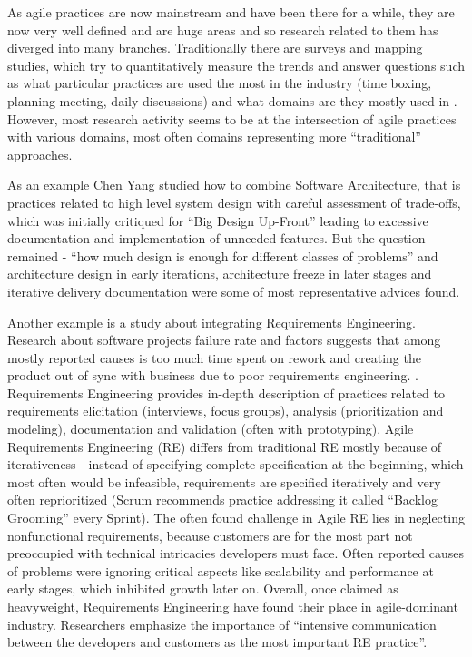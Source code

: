 \documentclass{article}
\begin{document}
As agile practices are now mainstream and have been there for a while, they are now very well defined and are huge areas and so research related to them has diverged into many branches. Traditionally there are surveys and mapping studies, which try to quantitatively measure the trends and answer questions such as what particular practices are used the most in the industry (time boxing, planning meeting, daily discussions) and what domains are they mostly used in \cite{diebold2014agile}. However, most research activity seems to be at the intersection of agile practices with various domains, most often domains representing more ``traditional'' approaches.

As an example Chen Yang \cite{yang2016systematic} studied how to combine Software Architecture, that is practices related to high level system design with careful assessment of trade-offs, which was initially critiqued for ``Big Design Up-Front'' leading to excessive documentation and implementation of unneeded features. But the question remained - ``how much design is enough for different classes of problems'' and architecture design in early iterations, architecture freeze in later stages and iterative delivery documentation were some of most representative advices found.

Another example is a study about integrating Requirements Engineering. Research about software projects failure rate and factors suggests that among mostly reported causes is too much time spent on rework and creating the product out of sync with business due to poor requirements engineering. \cite{arcidiacono2017comparative}. Requirements Engineering provides in-depth description of practices related to requirements elicitation (interviews, focus groups), analysis (prioritization and modeling), documentation and validation (often with prototyping). Agile Requirements Engineering (RE) differs from traditional RE mostly because of iterativeness - instead of specifying complete specification at the beginning, which most often would be infeasible, requirements are specified iteratively and very often reprioritized (Scrum recommends practice addressing it called ``Backlog Grooming'' every Sprint\cite{rubin2012essential}). The often found challenge in Agile RE lies in neglecting nonfunctional requirements, because customers are for the most part not preoccupied with technical intricacies developers must face. Often reported causes of problems were ignoring critical aspects like scalability and performance at early stages, which inhibited growth later on. Overall, once claimed as heavyweight, Requirements Engineering have found their place in agile-dominant industry. Researchers emphasize the importance of ``intensive communication between the developers and customers as the most important RE practice''. \cite{paetsch2003requirements} \cite{cao2008agile} 
\end{document}
